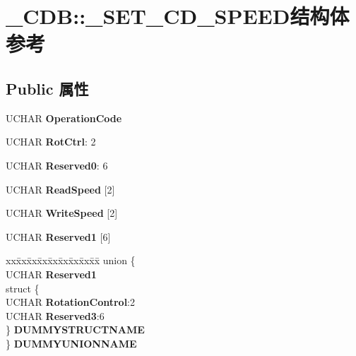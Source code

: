 \hypertarget{struct___c_d_b_1_1___s_e_t___c_d___s_p_e_e_d}{}\section{\+\_\+\+C\+DB\+:\+:\+\_\+\+S\+E\+T\+\_\+\+C\+D\+\_\+\+S\+P\+E\+E\+D结构体 参考}
\label{struct___c_d_b_1_1___s_e_t___c_d___s_p_e_e_d}
\subsection*{Public 属性}
\begin{DoxyCompactItemize}
\item 
\mbox{\label{struct___c_d_b_1_1___s_e_t___c_d___s_p_e_e_d_a26a7f401a698ac32372388881493a8ce}} 
U\+C\+H\+AR {\bfseries Operation\+Code}
\item 
\mbox{\label{struct___c_d_b_1_1___s_e_t___c_d___s_p_e_e_d_af400eddace981f3e0b7c2771336b8300}} 
U\+C\+H\+AR {\bfseries Rot\+Ctrl}\+: 2
\item 
\mbox{\label{struct___c_d_b_1_1___s_e_t___c_d___s_p_e_e_d_a31d345845f66973f87772647933e9bd2}} 
U\+C\+H\+AR {\bfseries Reserved0}\+: 6
\item 
\mbox{\label{struct___c_d_b_1_1___s_e_t___c_d___s_p_e_e_d_ad38b1efaf0344adde9a30703273f66e0}} 
U\+C\+H\+AR {\bfseries Read\+Speed} \mbox{[}2\mbox{]}
\item 
\mbox{\label{struct___c_d_b_1_1___s_e_t___c_d___s_p_e_e_d_a733554bfe39a54908e91abff69f662d3}} 
U\+C\+H\+AR {\bfseries Write\+Speed} \mbox{[}2\mbox{]}
\item 
\mbox{\label{struct___c_d_b_1_1___s_e_t___c_d___s_p_e_e_d_a6565585a4a56af2fdd112e901729bdcc}} 
U\+C\+H\+AR {\bfseries Reserved1} \mbox{[}6\mbox{]}
\item 
\mbox{\label{struct___c_d_b_1_1___s_e_t___c_d___s_p_e_e_d_a0187e5dea93461ff7bcf19acc026e023}} 
\begin{tabbing}
xx\=xx\=xx\=xx\=xx\=xx\=xx\=xx\=xx\=\kill
union \{\\
\>UCHAR {\bfseries Reserved1}\\
\>struct \{\\
\>\>UCHAR {\bfseries RotationControl}:2\\
\>\>UCHAR {\bfseries Reserved3}:6\\
\>\} {\bfseries DUMMYSTRUCTNAME}\\
\} {\bfseries DUMMYUNIONNAME}\\


\end{tabbing}
\end{DoxyCompactItemize}
